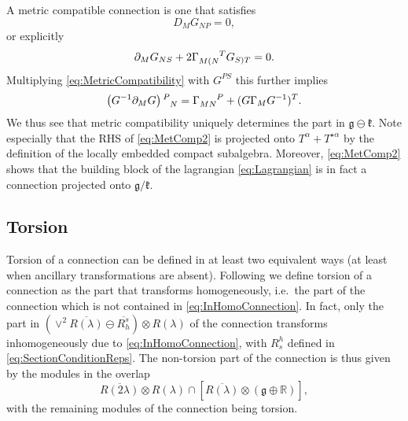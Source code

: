 A metric compatible connection is one that satisfies 
\begin{equation}
    D_M G_{NP} = 0,
\end{equation}
or explicitly
\begin{equation}\label{eq:MetricCompatibility}
    \pd_M G_{NS} + 2\tensor{\Gamma}{_{M(N}^T}G_{S)T}=0.
\end{equation}
Multiplying \eqref{eq:MetricCompatibility} with $G^{PS}$ this further implies 
\begin{equation}\label{eq:MetComp2}
    \left(G^{-1}\pd_MG\right)\tensor{}{^P_N} = \tensor{\Gamma}{_{MN}^P}+(G\Gamma_MG^{-1})^T.
\end{equation}
We thus see that metric compatibility uniquely determines the part in $\mathfrak{g}\ominus\mathfrak{k}$. Note especially that the RHS of \eqref{eq:MetComp2} is projected onto $T^\alpha+T^{\star\alpha}$ by the definition of the locally embedded compact subalgebra. Moreover, \eqref{eq:MetComp2} shows that the building block of the lagrangian \eqref{eq:Lagrangian} is in fact a connection projected onto $\mathfrak{g}/\mathfrak{k}$. 

\subsection{Torsion}
Torsion of a connection can be defined in at least two equivalent ways (at least when ancillary transformations are absent). Following \cite{Cederwall:2013naa} we define torsion of a connection as the part that transforms homogeneously, i.e.\ the part of the connection which is not contained in \eqref{eq:InHomoConnection}. In fact, only the part in $\left(\vee^2\overbar{R(\lambda)}\ominus \overbar{R_h^s}\right)\otimes R(\lambda)$ of the connection transforms inhomogeneously due to \eqref{eq:InHomoConnection}, with $R_s^h$ defined in \eqref{eq:SectionConditionReps}. The non-torsion part of the connection is thus given by the modules in the overlap 
\begin{equation}
    \overbar{R(2\lambda)}\otimes R(\lambda) \cap \left[\overbar{R(\lambda)}\otimes \left(\mathfrak{g}\oplus \mathbb{R}\right)\right],
\end{equation}
with the remaining modules of the connection being torsion. 

